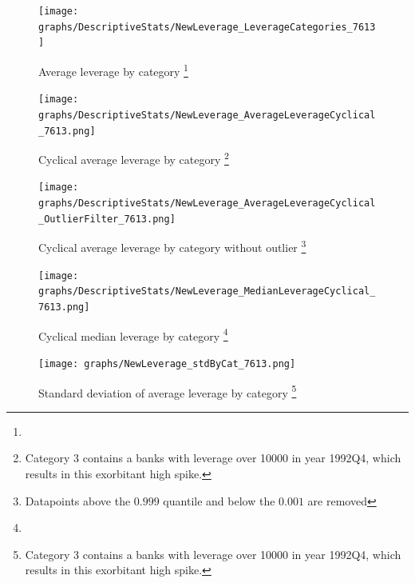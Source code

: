 \documentclass[12pt, a4paper]{article} %
\begin{document}
\begin{figure}[hbtp]
\begin{minipage}{\textwidth}
\centering
\caption[1]{Average leverage by category \footnote{}}
\texttt{[image: graphs/DescriptiveStats/NewLeverage\_LeverageCategories\_7613]}
\label{fig:averageLeverage_Categories}
\end{minipage}
\end{figure}

\begin{figure}[hbtp]
\begin{minipage}{\textwidth}
\centering
\caption[1]{Cyclical average leverage by category \footnote{Category 3 contains a banks with leverage over 10000 in year 1992Q4, which results in this exorbitant high spike.}}
\texttt{[image: graphs/DescriptiveStats/NewLeverage\_AverageLeverageCyclical\_7613.png]}
\label{fig:averageLeverage_cyclical_Categories}
\end{minipage}
\end{figure}

\begin{figure}[hbtp]
\begin{minipage}{\textwidth}
\centering
\caption[1]{Cyclical average leverage by category without outlier \footnote{Datapoints above the $0.999$ quantile and below the $0.001$ are removed}}
\texttt{[image: graphs/DescriptiveStats/NewLeverage\_AverageLeverageCyclical\_OutlierFilter\_7613.png]}
\label{fig:averageLeverage_cyclical_noOutlier_Categories}
\end{minipage}
\end{figure}


\begin{figure}[hbtp]
\begin{minipage}{\textwidth}
\centering
\caption[1]{Cyclical median leverage by category \footnote{}}
\texttt{[image: graphs/DescriptiveStats/NewLeverage\_MedianLeverageCyclical\_7613.png]}
\label{fig:medianLeverage_cyclical_Categories}
\end{minipage}
\end{figure}

\begin{figure}[hbtp]
\begin{minipage}{\textwidth}
\centering
\caption[1]{Standard deviation of average leverage by category \footnote{Category 3 contains a banks with leverage over 10000 in year 1992Q4, which results in this exorbitant high spike.}}
\texttt{[image: graphs/NewLeverage\_stdByCat\_7613.png]}
\label{fig:averageLeverage_Std_Categories}
\end{minipage}
\end{figure}
\end{document}
